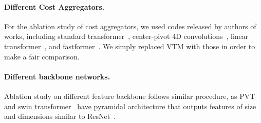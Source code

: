 \paragraph{Different Cost Aggregators.}
For the ablation study of cost aggregators, we used codes released by authors of works, including standard transformer~\cite{vaswani2017attention}, center-pivot 4D convolutions~\cite{min2021hypercorrelation}, linear transformer~\cite{katharopoulos2020transformers}, and fastformer~\cite{wu2021fastformer}. We simply replaced VTM with those in order to make a fair comparison.\vspace{-10pt}

\paragraph{Different backbone networks.} Ablation study on different feature backbone follows similar procedure, as PVT~\cite{wang2021pyramid} and swin transformer~\cite{liu2021swin} have pyramidal architecture that outputs features of size and dimensions similar to ResNet~\cite{he2016deep}. 
\vspace{-10pt}

